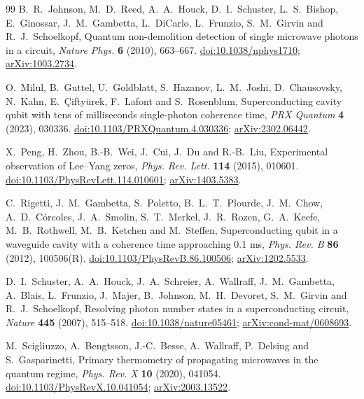 \documentclass[11pt,reqno]{amsart}
\numberwithin{equation}{section}
\theoremstyle{plain}
\theoremstyle{definition}
\theoremstyle{remark}
\begin{document}
\begin{thebibliography}{99}
B.~R.~Johnson, M.~D.~Reed, A.~A.~Houck, D.~I.~Schuster, L.~S.~Bishop, E.~Ginossar, J.~M.~Gambetta, L.~DiCarlo, L.~Frunzio, S.~M.~Girvin and R.~J.~Schoelkopf, Quantum non-demolition detection of single microwave photons in a circuit, \emph{Nature Phys.} \textbf{6} (2010), 663--667.
\href{https://doi.org/10.1038/nphys1710}{doi:10.1038/nphys1710};
\href{https://arxiv.org/abs/1003.2734}{arXiv:1003.2734}.

O.~Milul, B.~Guttel, U.~Goldblatt, S.~Hazanov, L.~M.~Joshi, D.~Chausovsky, N.~Kahn, E.~\c{C}ifty\"urek, F.~Lafont and S.~Rosenblum, Superconducting cavity qubit with tens of milliseconds single-photon coherence time, \emph{PRX Quantum} \textbf{4} (2023), 030336.
\href{https://doi.org/10.1103/PRXQuantum.4.030336}{doi:10.1103/PRXQuantum.4.030336};
\href{https://arxiv.org/abs/2302.06442}{arXiv:2302.06442}.

X.~Peng, H.~Zhou, B.-B.~Wei, J.~Cui, J.~Du and R.-B.~Liu, Experimental observation of Lee--Yang zeros, \emph{Phys. Rev. Lett.} \textbf{114} (2015), 010601.
\href{https://doi.org/10.1103/PhysRevLett.114.010601}{doi:10.1103/PhysRevLett.114.010601};
\href{https://arxiv.org/abs/1403.5383}{arXiv:1403.5383}.

C.~Rigetti, J.~M.~Gambetta, S.~Poletto, B.~L.~T.~Plourde, J.~M.~Chow, A.~D.~C\'orcoles, J.~A.~Smolin, S.~T.~Merkel, J.~R.~Rozen, G.~A.~Keefe, M.~B.~Rothwell, M.~B.~Ketchen and M.~Steffen, Superconducting qubit in a waveguide cavity with a coherence time approaching 0.1 ms, \emph{Phys. Rev. B} \textbf{86} (2012), 100506(R).
\href{https://doi.org/10.1103/PhysRevB.86.100506}{doi:10.1103/PhysRevB.86.100506};
\href{https://arxiv.org/abs/1202.5533}{arXiv:1202.5533}.

D.~I.~Schuster, A.~A.~Houck, J.~A.~Schreier, A.~Wallraff, J.~M.~Gambetta, A.~Blais, L.~Frunzio, J.~Majer, B.~Johnson, M.~H.~Devoret, S.~M.~Girvin and R.~J.~Schoelkopf, Resolving photon number states in a superconducting circuit, \emph{Nature} \textbf{445} (2007), 515--518.
\href{https://doi.org/10.1038/nature05461}{doi:10.1038/nature05461};
\href{https://arxiv.org/abs/cond-mat/0608693}{arXiv:cond-mat/0608693}.

M.~Scigliuzzo, A.~Bengtsson, J.-C.~Besse, A.~Wallraff, P.~Delsing and S.~Gasparinetti, Primary thermometry of propagating microwaves in the quantum regime, \emph{Phys. Rev. X} \textbf{10} (2020), 041054.
\href{https://doi.org/10.1103/PhysRevX.10.041054}{doi:10.1103/PhysRevX.10.041054};
\href{https://arxiv.org/abs/2003.13522}{arXiv:2003.13522}.


\end{thebibliography}
\end{document}
